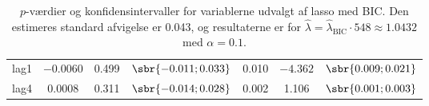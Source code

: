 \begin{table}[h]
{\begin{tabular}{lcccccc}
\textcolor{blue3}{lag1} &$-0.0060$ &0.499  &  $\sbr{-0.011 ; 0.033}$ &  0.010& $ -4.362$ &  $\sbr{0.009           ;    0.021 }$\\
\textcolor{blue3}{lag4}  & 0.0008&0.311    & $\sbr{ -0.014;   0.028 }$ &0.002 &   1.106   & $\sbr{0.001              ; 0.003}$\\
\bottomrule
\end{tabular}  
}
\caption{\(p\)-værdier og konfidensintervaller for variablerne udvalgt af lasso med BIC. Den estimeres standard afvigelse er 0.043, og resultaterne er for $\widehat{\lambda} = \widehat{\lambda}_\text{BIC} \cdot 548 \approx 1.0432$  med \(\alpha = 0.1\).} \label{tab:fixedLassoInf_bic}
\end{table} 